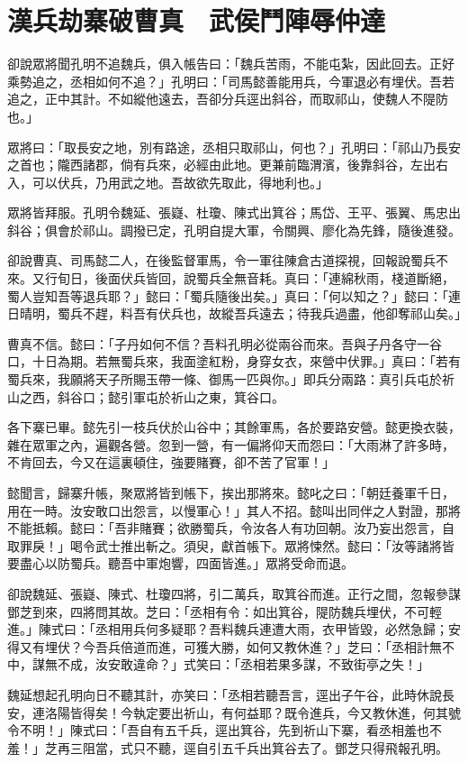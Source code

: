 
\chapter{漢兵劫寨破曹真　武侯鬥陣辱仲達}

卻說眾將聞孔明不追魏兵，俱入帳告曰：「魏兵苦雨，不能屯紮，因此回去。正好乘勢追之，丞相如何不追？」孔明曰：「司馬懿善能用兵，今軍退必有埋伏。吾若追之，正中其計。不如縱他遠去，吾卻分兵逕出斜谷，而取祁山，使魏人不隄防也。」

眾將曰：「取長安之地，別有路途，丞相只取祁山，何也？」孔明曰：「祁山乃長安之首也；隴西諸郡，倘有兵來，必經由此地。更兼前臨渭濱，後靠斜谷，左出右入，可以伏兵，乃用武之地。吾故欲先取此，得地利也。」

眾將皆拜服。孔明令魏延、張嶷、杜瓊、陳式出箕谷；馬岱、王平、張翼、馬忠出斜谷；俱會於祁山。調撥已定，孔明自提大軍，令關興、廖化為先鋒，隨後進發。

卻說曹真、司馬懿二人，在後監督軍馬，令一軍往陳倉古道探視，回報說蜀兵不來。又行旬日，後面伏兵皆回，說蜀兵全無音耗。真曰：「連綿秋雨，棧道斷絕，蜀人豈知吾等退兵耶？」懿曰：「蜀兵隨後出矣。」真曰：「何以知之？」懿曰：「連日晴明，蜀兵不趕，料吾有伏兵也，故縱吾兵遠去；待我兵過盡，他卻奪祁山矣。」

曹真不信。懿曰：「子丹如何不信？吾料孔明必從兩谷而來。吾與子丹各守一谷口，十日為期。若無蜀兵來，我面塗紅粉，身穿女衣，來營中伏罪。」真曰：「若有蜀兵來，我願將天子所賜玉帶一條、御馬一匹與你。」即兵分兩路：真引兵屯於祈山之西，斜谷口；懿引軍屯於祈山之東，箕谷口。

各下寨已畢。懿先引一枝兵伏於山谷中；其餘軍馬，各於要路安營。懿更換衣裝，雜在眾軍之內，遍觀各營。忽到一營，有一偏將仰天而怨曰：「大雨淋了許多時，不肯回去，今又在這裏頓住，強要賭賽，卻不苦了官軍！」

懿聞言，歸寨升帳，聚眾將皆到帳下，挨出那將來。懿叱之曰：「朝廷養軍千日，用在一時。汝安敢口出怨言，以慢軍心！」其人不招。懿叫出同伴之人對證，那將不能抵賴。懿曰：「吾非賭賽；欲勝蜀兵，令汝各人有功回朝。汝乃妄出怨言，自取罪戾！」喝令武士推出斬之。須臾，獻首帳下。眾將悚然。懿曰：「汝等諸將皆要盡心以防蜀兵。聽吾中軍炮響，四面皆進。」眾將受命而退。

卻說魏延、張嶷、陳式、杜瓊四將，引二萬兵，取箕谷而進。正行之間，忽報參謀鄧芝到來，四將問其故。芝曰：「丞相有令：如出箕谷，隄防魏兵埋伏，不可輕進。」陳式曰：「丞相用兵何多疑耶？吾料魏兵連遭大雨，衣甲皆毀，必然急歸；安得又有埋伏？今吾兵倍道而進，可獲大勝，如何又教休進？」芝曰：「丞相計無不中，謀無不成，汝安敢違命？」式笑曰：「丞相若果多謀，不致街亭之失！」

魏延想起孔明向日不聽其計，亦笑曰：「丞相若聽吾言，逕出子午谷，此時休說長安，連洛陽皆得矣！今執定要出祈山，有何益耶？既令進兵，今又教休進，何其號令不明！」陳式曰：「吾自有五千兵，逕出箕谷，先到祈山下寨，看丞相羞也不羞！」芝再三阻當，式只不聽，逕自引五千兵出箕谷去了。鄧芝只得飛報孔明。

